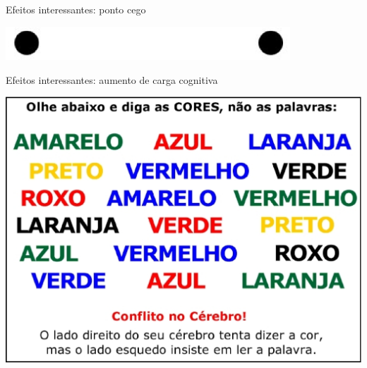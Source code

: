       \begin{slide}[toc=]{Efeitos interessantes: ponto cego}
	    \vspace{5cm}
            \begin{center}
               \includegraphics[width=0.8\textwidth]{figs/visao_22.eps}
            \end{center}
      \end{slide}
      \begin{slide}[toc=]{Efeitos interessantes: aumento de carga cognitiva}
            \begin{center}
               \includegraphics[height=0.8\textheight]{figs/conflito.eps}
            \end{center}
      \end{slide}

